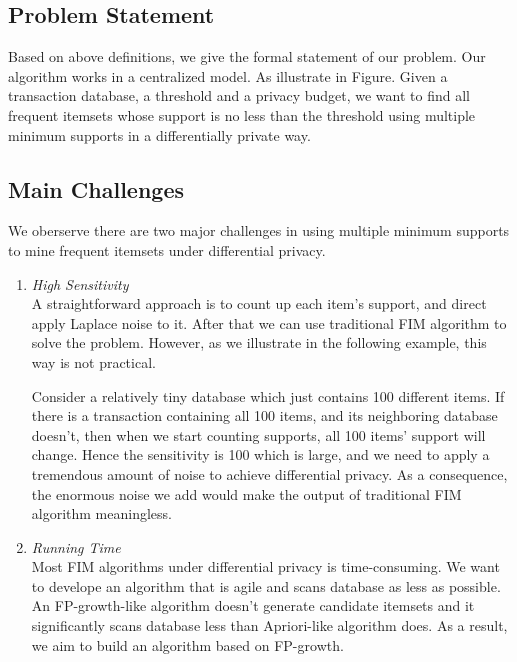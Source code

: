 \documentclass[conference]{IEEEtran}
\begin{document}
\subsection{Problem Statement}
Based on above definitions, we give the formal statement of our problem. 
Our algorithm works in a centralized model. As illustrate in Figure. %
Given a transaction database, a threshold and a privacy budget, we want to find all frequent itemsets whose support is no less than the threshold using multiple minimum supports in a differentially private way.
\subsection{Main Challenges}
We oberserve there are two major challenges in using multiple minimum supports to mine frequent itemsets under differential privacy.
\begin{enumerate}
    \item {\it High Sensitivity}\\
    A straightforward approach is to count up each item's support, and direct apply Laplace noise to it. After that we can use traditional FIM algorithm to solve the problem.
    However, as we illustrate in the following example, this way is not practical.
    \begin{example}
        Consider a relatively tiny database which just contains 100 different items.
        If there is a transaction containing all 100 items, and its neighboring database doesn't, then when we start counting supports, all 100 items' support will change.
        Hence the sensitivity is 100 which is large, and we need to apply a tremendous amount of noise to achieve differential privacy. 
        As a consequence, the enormous noise we add would make the output of traditional FIM algorithm meaningless.
    \end{example}
    
    \item {\it Running Time}\\
    Most FIM algorithms under differential privacy is time-consuming. 
    We want to develope an algorithm that is agile and scans database as less as possible.
    An FP-growth-like algorithm doesn't generate candidate itemsets and it significantly scans database less than Apriori-like algorithm does.
    As a result, we aim to build an algorithm based on FP-growth.
    
\end{enumerate} 
\end{document}
